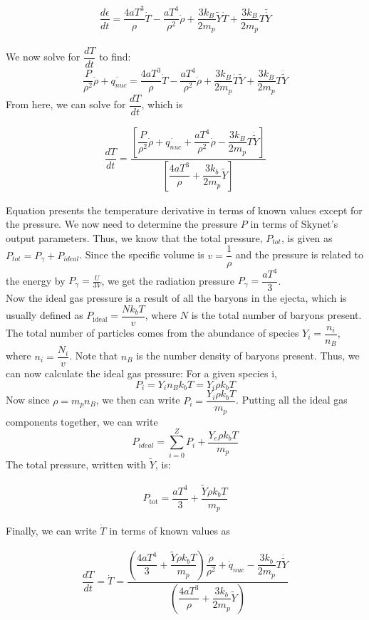 \documentclass[11pt,a4paper]{article}
\begin{document}
$$ \dfrac{d \epsilon}{dt} = \dfrac{4a T^3}{\rho}\dot{T} - \dfrac{a T^4}{\rho^2} \dot{\rho} + \dfrac{3 k_B}{2 m_p} \tilde{Y} \dot{T} + \dfrac{3 k_B}{2 m_p} T \tilde{\dot{Y}} $$ \\

We now solve for $\dfrac{dT}{dt}$ to find: 
$$ \dfrac{P}{\rho^2} \dot{\rho} + \dot{q_{nuc}} = \dfrac{4a T^3}{\rho} \dot{T} -  \dfrac{aT^4}{\rho^2} \dot{\rho} + \dfrac{3 k_B}{2 m_p} \dot{T} \tilde{Y} + \dfrac{3 k_B}{2 m_p} T \dot{\tilde{Y}} $$ From here, we can solve for $\dfrac{dT}{dt}$, which is 

\begin{align}
	\dfrac{dT}{dt} = \dfrac{[ \dfrac{P}{\rho^2} \dot{\rho} + \dot{q_{nuc}} + \dfrac{aT^4}{\rho^2} \dot{\rho} - \dfrac{3 k_B}{2 m_p} T \dot{\tilde{Y}}]} {[\dfrac{4a T^3}{\rho} + \dfrac{3 k_b}{2 m_p} \tilde{Y}]}
\end{align}

Equation presents the temperature derivative in terms of known values except for the pressure. We now need to determine the pressure $P$ in terms of Skynet's output parameters. Thus, we know that the total pressure, $P_{tot}$, is given as $P_{tot} = P_{\gamma} + P_{ideal}$. Since the specific volume is $v = \dfrac{1}{\rho}$ and the pressure is related to the energy by $P_\gamma = \frac{U}{3V}$,  we get the radiation pressure $P_{\gamma} = \dfrac{a T^4}{3}$.\\
Now the ideal gas pressure is a result of all the baryons in the ejecta, which is usually defined as $P_\mathrm{ideal} = \dfrac{N k_b T}{v}$, where $N$ is the total number of baryons present. The total number of particles comes from the abundance of species $Y_i = \dfrac{n_i}{n_B}$, where $n_i = \dfrac{N_i}{v}$. Note that $n_B$ is the number density of baryons present. Thus, we can now calculate the ideal gas pressure: For a given species i,
$$ P_i = Y_i n_B k_b T  = Y_i \rho k_b T$$ Now since $\rho = m_p n_B$, we then can write $P_i = \dfrac{Y_i \rho k_b T}{m_p}$. Putting all the ideal gas components together, we can write 
$$ P_{ideal} = \sum_{i=0}^{Z} P_i + \dfrac{Y_e \rho k_b T}{m_p} $$ The total pressure, written with $\tilde{Y}$, is:

\begin{align}
	P_\mathrm{tot} = \dfrac{a T^4}{3} + \dfrac{\tilde{Y} \rho k_b T}{m_p}
\end{align} 

Finally, we can write $\dot{T}$ in terms of known values as 

\begin{align}
	\dfrac{dT}{dt} = \dot{T} = \dfrac{ \left(\dfrac{4 a T^4}{3} + \dfrac{\tilde{Y} \rho k_b T}{m_p} \right) \dfrac{\dot{\rho}}{\rho ^2} + \dot{q}_{nuc} - \dfrac{3 k_b}{2 m_p} T \dot{\tilde{Y}}} { \left( \dfrac{4a T^3}{\rho}  + \dfrac{3 k_b}{2 m_p} \tilde{Y} \right)}
\end{align}
\end{document}
